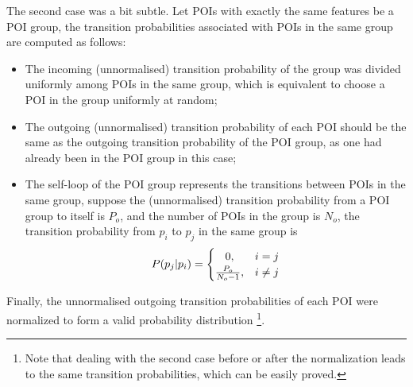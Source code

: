 The second case was a bit subtle.
Let POIs with exactly the same features be a POI group,
the transition probabilities associated with POIs in the same group are computed as follows:
\begin{itemize}
\item The incoming (unnormalised) transition probability of the group was divided uniformly among POIs
      in the same group, which is equivalent to choose a POI in the group uniformly at random;
\item The outgoing (unnormalised) transition probability of each POI should be the same as the
      outgoing transition probability of the POI group, as one had already been in the POI group in this case;
\item The self-loop of the POI group represents the transitions between POIs in the same group,
      suppose the (unnormalised) transition probability from a POI group to itself is $P_o$,
      and the number of POIs in the group is $N_o$,
      the transition probability from $p_i$ to $p_j$ in the same group is
      \begin{displaymath}
          P(p_j | p_i) =
          \begin{cases}
              \hfill 0, \hfill & i = j \\
              \hfill \frac{P_o}{N_o - 1}, \hfill & i \ne j \\
          \end{cases}
      \end{displaymath}
\end{itemize}
Finally, the unnormalised outgoing transition probabilities of each POI were normalized to form
a valid probability distribution
\footnote{Note that dealing with the second case before or after the normalization leads to
the same transition probabilities, which can be easily proved. }.


